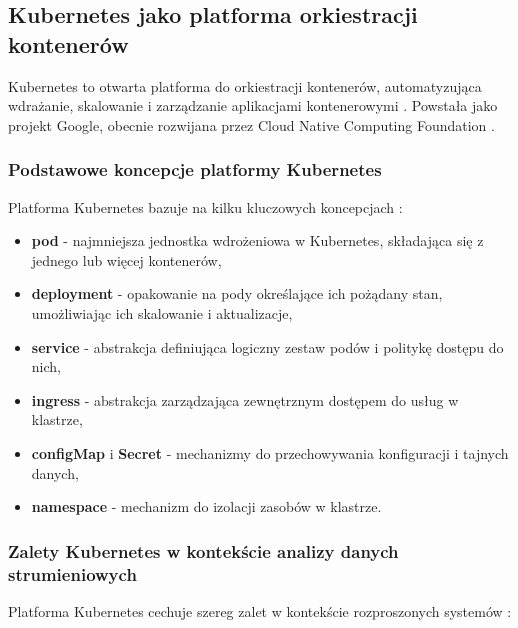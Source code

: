 \subsection{Kubernetes jako platforma orkiestracji kontenerów}
\label{subsec:kubernetes}

Kubernetes to otwarta platforma do orkiestracji kontenerów, automatyzująca wdrażanie, skalowanie i zarządzanie aplikacjami
kontenerowymi \cite{kubernetes}. Powstała jako projekt Google, obecnie rozwijana przez Cloud Native Computing Foundation \cite{cncf_website}.

\subsubsection{Podstawowe koncepcje platformy Kubernetes}
\label{subsubsec:podstawy_kubernetes}

Platforma Kubernetes bazuje na kilku kluczowych koncepcjach \cite{kubernetes_concepts}:

\begin{itemize}
    \item \textbf{pod} - najmniejsza jednostka wdrożeniowa w Kubernetes, składająca się z jednego lub więcej kontenerów,
    \item \textbf{deployment} - opakowanie na pody określające ich pożądany stan, umożliwiając ich skalowanie i aktualizacje,
    \item \textbf{service} - abstrakcja definiująca logiczny zestaw podów i politykę dostępu do nich,
    \item \textbf{ingress} - abstrakcja zarządzająca zewnętrznym dostępem do usług w klastrze,
    \item \textbf{configMap} i \textbf{Secret} - mechanizmy do przechowywania konfiguracji i tajnych danych,
    \item \textbf{namespace} - mechanizm do izolacji zasobów w klastrze.
\end{itemize}

\subsubsection{Zalety Kubernetes w kontekście analizy danych strumieniowych}
\label{subsubsec:zalety_kubernetes}

Platforma Kubernetes cechuje szereg zalet w kontekście rozproszonych systemów \cite{kubernetes_benefits}:

